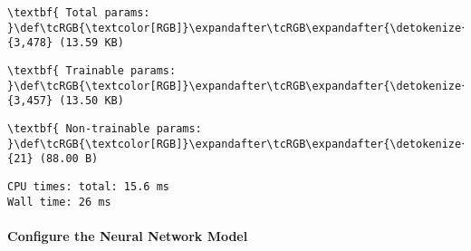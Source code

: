 \documentclass[11pt]{article}
\begin{document}
\begin{Verbatim}[commandchars=\\\{\}]
    \end{Verbatim}

    
    
    \begin{Verbatim}[commandchars=\\\{\}]
\textbf{ Total params: }\def\tcRGB{\textcolor[RGB]}\expandafter\tcRGB\expandafter{\detokenize{0,175,0}}{3,478} (13.59 KB)

    \end{Verbatim}

    
    
    \begin{Verbatim}[commandchars=\\\{\}]
\textbf{ Trainable params: }\def\tcRGB{\textcolor[RGB]}\expandafter\tcRGB\expandafter{\detokenize{0,175,0}}{3,457} (13.50 KB)

    \end{Verbatim}

    
    
    \begin{Verbatim}[commandchars=\\\{\}]
\textbf{ Non-trainable params: }\def\tcRGB{\textcolor[RGB]}\expandafter\tcRGB\expandafter{\detokenize{0,175,0}}{21} (88.00 B)

    \end{Verbatim}

    
    \begin{Verbatim}[commandchars=\\\{\}]
CPU times: total: 15.6 ms
Wall time: 26 ms
    \end{Verbatim}

    \paragraph{Configure the Neural Network
Model}\label{configure-the-neural-network-model}
\end{document}
